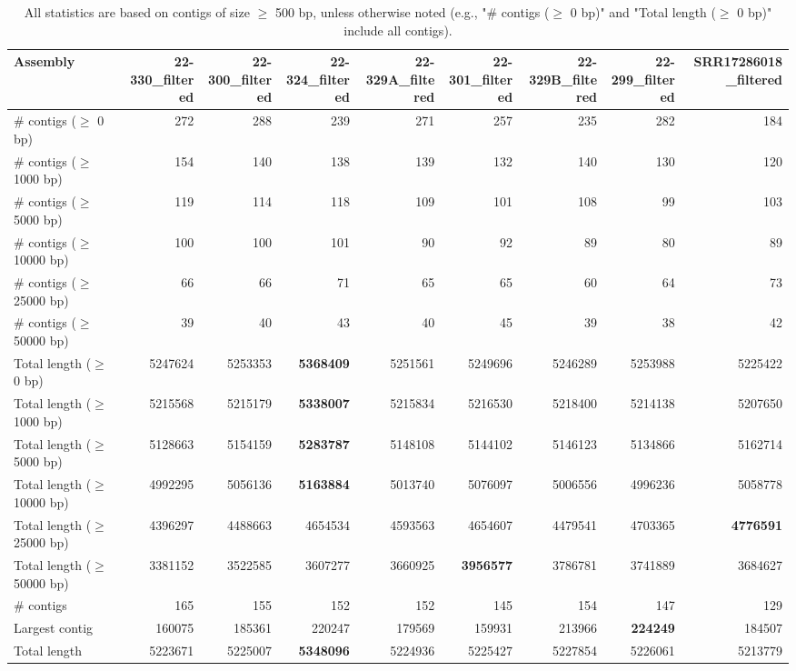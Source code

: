 \documentclass[12pt,a4paper]{article}
\begin{document}
\begin{table}[ht]
\begin{center}
\caption{All statistics are based on contigs of size $\geq$ 500 bp, unless otherwise noted (e.g., "\# contigs ($\geq$ 0 bp)" and "Total length ($\geq$ 0 bp)" include all contigs).}
\begin{tabular}{|l*{8}{|r}|}
\hline
Assembly & 22-330\_filtered & 22-300\_filtered & 22-324\_filtered & 22-329A\_filtered & 22-301\_filtered & 22-329B\_filtered & 22-299\_filtered & SRR17286018\_filtered \\ \hline
\# contigs ($\geq$ 0 bp) & 272 & 288 & 239 & 271 & 257 & 235 & 282 & 184 \\ \hline
\# contigs ($\geq$ 1000 bp) & 154 & 140 & 138 & 139 & 132 & 140 & 130 & 120 \\ \hline
\# contigs ($\geq$ 5000 bp) & 119 & 114 & 118 & 109 & 101 & 108 & 99 & 103 \\ \hline
\# contigs ($\geq$ 10000 bp) & 100 & 100 & 101 & 90 & 92 & 89 & 80 & 89 \\ \hline
\# contigs ($\geq$ 25000 bp) & 66 & 66 & 71 & 65 & 65 & 60 & 64 & 73 \\ \hline
\# contigs ($\geq$ 50000 bp) & 39 & 40 & 43 & 40 & 45 & 39 & 38 & 42 \\ \hline
Total length ($\geq$ 0 bp) & 5247624 & 5253353 & {\bf 5368409} & 5251561 & 5249696 & 5246289 & 5253988 & 5225422 \\ \hline
Total length ($\geq$ 1000 bp) & 5215568 & 5215179 & {\bf 5338007} & 5215834 & 5216530 & 5218400 & 5214138 & 5207650 \\ \hline
Total length ($\geq$ 5000 bp) & 5128663 & 5154159 & {\bf 5283787} & 5148108 & 5144102 & 5146123 & 5134866 & 5162714 \\ \hline
Total length ($\geq$ 10000 bp) & 4992295 & 5056136 & {\bf 5163884} & 5013740 & 5076097 & 5006556 & 4996236 & 5058778 \\ \hline
Total length ($\geq$ 25000 bp) & 4396297 & 4488663 & 4654534 & 4593563 & 4654607 & 4479541 & 4703365 & {\bf 4776591} \\ \hline
Total length ($\geq$ 50000 bp) & 3381152 & 3522585 & 3607277 & 3660925 & {\bf 3956577} & 3786781 & 3741889 & 3684627 \\ \hline
\# contigs & 165 & 155 & 152 & 152 & 145 & 154 & 147 & 129 \\ \hline
Largest contig & 160075 & 185361 & 220247 & 179569 & 159931 & 213966 & {\bf 224249} & 184507 \\ \hline
Total length & 5223671 & 5225007 & {\bf 5348096} & 5224936 & 5225427 & 5227854 & 5226061 & 5213779 \\ \hline

\end{tabular}
\end{center}
\end{table}
\end{document}
